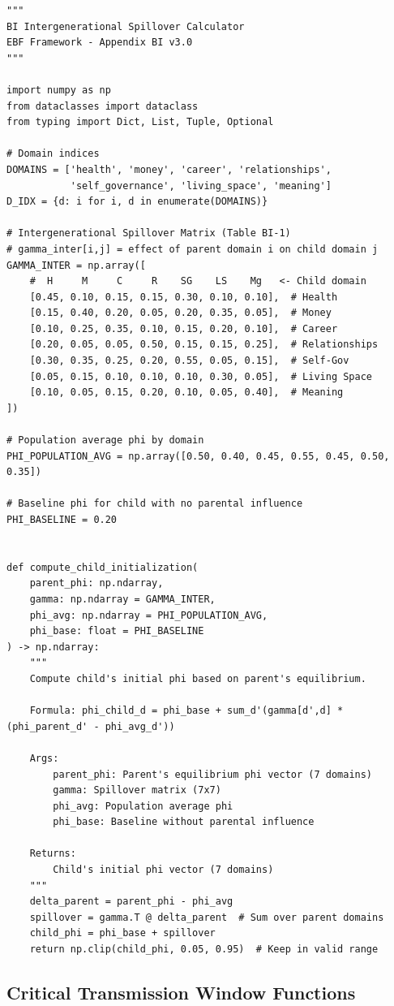 \begin{verbatim}
"""
BI Intergenerational Spillover Calculator
EBF Framework - Appendix BI v3.0
"""

import numpy as np
from dataclasses import dataclass
from typing import Dict, List, Tuple, Optional

# Domain indices
DOMAINS = ['health', 'money', 'career', 'relationships',
           'self_governance', 'living_space', 'meaning']
D_IDX = {d: i for i, d in enumerate(DOMAINS)}

# Intergenerational Spillover Matrix (Table BI-1)
# gamma_inter[i,j] = effect of parent domain i on child domain j
GAMMA_INTER = np.array([
    #  H     M     C     R    SG    LS    Mg   <- Child domain
    [0.45, 0.10, 0.15, 0.15, 0.30, 0.10, 0.10],  # Health
    [0.15, 0.40, 0.20, 0.05, 0.20, 0.35, 0.05],  # Money
    [0.10, 0.25, 0.35, 0.10, 0.15, 0.20, 0.10],  # Career
    [0.20, 0.05, 0.05, 0.50, 0.15, 0.15, 0.25],  # Relationships
    [0.30, 0.35, 0.25, 0.20, 0.55, 0.05, 0.15],  # Self-Gov
    [0.05, 0.15, 0.10, 0.10, 0.10, 0.30, 0.05],  # Living Space
    [0.10, 0.05, 0.15, 0.20, 0.10, 0.05, 0.40],  # Meaning
])

# Population average phi by domain
PHI_POPULATION_AVG = np.array([0.50, 0.40, 0.45, 0.55, 0.45, 0.50, 0.35])

# Baseline phi for child with no parental influence
PHI_BASELINE = 0.20


def compute_child_initialization(
    parent_phi: np.ndarray,
    gamma: np.ndarray = GAMMA_INTER,
    phi_avg: np.ndarray = PHI_POPULATION_AVG,
    phi_base: float = PHI_BASELINE
) -> np.ndarray:
    """
    Compute child's initial phi based on parent's equilibrium.

    Formula: phi_child_d = phi_base + sum_d'(gamma[d',d] * (phi_parent_d' - phi_avg_d'))

    Args:
        parent_phi: Parent's equilibrium phi vector (7 domains)
        gamma: Spillover matrix (7x7)
        phi_avg: Population average phi
        phi_base: Baseline without parental influence

    Returns:
        Child's initial phi vector (7 domains)
    """
    delta_parent = parent_phi - phi_avg
    spillover = gamma.T @ delta_parent  # Sum over parent domains
    child_phi = phi_base + spillover
    return np.clip(child_phi, 0.05, 0.95)  # Keep in valid range
\end{verbatim}

\subsection{Critical Transmission Window Functions}

